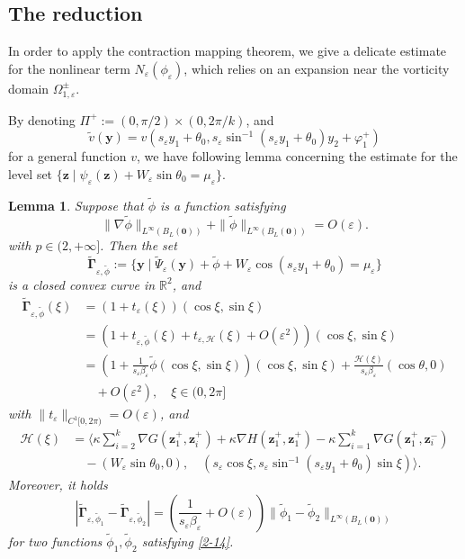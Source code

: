 \documentclass[12pt,reqno]{amsart}
\numberwithin{equation}{section}
\newtheorem{lemma}[theorem]{Lemma}
\theoremstyle{definition}
\theoremstyle{remark}
\newcommand{\ep}{\varepsilon}
\begin{document}
	\subsection{The reduction}
	In order to apply the contraction mapping theorem, we give a delicate estimate for the nonlinear term $N_\varepsilon(\phi_\varepsilon)$, which relies on an expansion near the vorticity domain $\Omega_{1,\varepsilon}^\pm$. 
	
	By denoting $\Pi^+:=(0,\pi/2)\times\left(0,2\pi/k\right)$, and 
	$$\tilde v(\boldsymbol y)=v(s_\varepsilon y_1+\theta_0,s_\varepsilon\sin^{-1}(s_\varepsilon y_1+\theta_0)y_2+\varphi_1^+)$$ for a general function $v$, we have following lemma concerning the estimate for the level set $\{\boldsymbol z\mid \psi_\varepsilon(\boldsymbol z)+W_\varepsilon\sin\theta_0=\mu_\varepsilon\}$.
	\begin{lemma}\label{lem2-4}
		Suppose that $\tilde\phi$ is a function satisfying
		\begin{equation}\label{2-14}
			\|\nabla\tilde\phi\|_{L^\infty(B_L(\boldsymbol 0))}+\|\tilde\phi\|_{L^\infty(B_L(\boldsymbol 0))}=O(\varepsilon).
		\end{equation}
		with $p\in(2,+\infty]$. Then the set
		$$\tilde{\mathbf\Gamma}_{\varepsilon,\tilde\phi}:=\{\boldsymbol y \mid \tilde\Psi_\varepsilon(\boldsymbol y)+\tilde\phi+W_\ep\cos(s_\varepsilon y_1+\theta_0)=\mu_\varepsilon\}$$
		is a closed convex curve in $\mathbb{R}^2$, and
		\begin{equation}\label{2-15}
			\begin{split}
				\tilde{\mathbf\Gamma}_{\varepsilon,\tilde\phi}(\xi)&=(1+t_\varepsilon(\xi))(\cos\xi,\sin\xi)\\
				&=(1+t_{\varepsilon,\tilde\phi}(\xi)+t_{\varepsilon,\mathcal H}(\xi)+O(\varepsilon^2))(\cos\xi,\sin\xi)\\
				&=\left(1+\frac{1}{s_\varepsilon\beta_\varepsilon}\tilde\phi(\cos\xi,\sin\xi)\right)(\cos\xi,\sin\xi)+\frac{\mathcal H(\xi)}{s_\varepsilon\beta_\varepsilon}(\cos\theta,0)\\
				&\quad+O(\varepsilon^2), \quad \xi\in (0,2\pi]
			\end{split}
		\end{equation}
		with $\|t_\varepsilon\|_{C^1[0,2\pi)}=O(\ep)$, and 
		\begin{align*}
			\mathcal H(\xi)&=\bigg\langle\kappa \sum\limits_{i=2}^k\nabla G(\boldsymbol z_1^+,\boldsymbol z^+_i)+\kappa \nabla H(\boldsymbol z_1^+,\boldsymbol z^+_1)-\kappa \sum\limits_{i=1}^k\nabla G(\boldsymbol z_1^+,\boldsymbol z^-_i)\\
			&\quad-(W_\ep\sin\theta_0,0),\quad (s_\varepsilon\cos\xi,s_\varepsilon\sin^{-1}(s_\varepsilon y_1+\theta_0)\sin\xi)\bigg\rangle.
		\end{align*}
	    Moreover, it holds
		\begin{equation}\label{2-16}
			\left|\tilde{\mathbf\Gamma}_{\varepsilon,\tilde\phi_1}-\tilde{\mathbf\Gamma}_{\varepsilon,\tilde\phi_2}\right|=\left(\frac{1}{s_\varepsilon\beta_\varepsilon}+O(\varepsilon)\right)\|\tilde\phi_1-\tilde\phi_2\|_{L^\infty(B_L(\boldsymbol 0))}
		\end{equation}
		for two functions $\tilde\phi_1,\tilde\phi_2$ satisfying \eqref{2-14}.
	\end{lemma}
\end{document}
